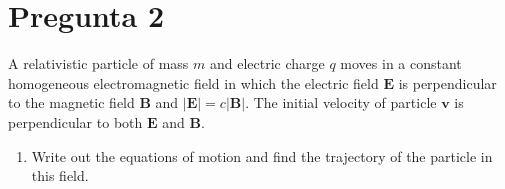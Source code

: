 \documentclass[]{article}
\numberwithin{equation}{section}
\newcommand{\0}{\textcolor{gray}{0}}
\begin{document}

\section{Pregunta 2}
A relativistic particle of mass \(m\) and electric charge \(q\) moves in a constant homogeneous electromagnetic field in which the electric field \(\mathbf{E}\) is perpendicular to the magnetic field \(\mathbf{B}\) and \(|\mathbf{E}| = c|\mathbf{B}|\). The initial velocity of particle \(\mathbf{v}\) is perpendicular to both \(\mathbf{E}\) and \(\mathbf{B} \).


\begin{enumerate}
	\item[\textbf{a.}] Write out the equations of motion and find the trajectory of the particle in this field.
\end{enumerate}
\end{document}
